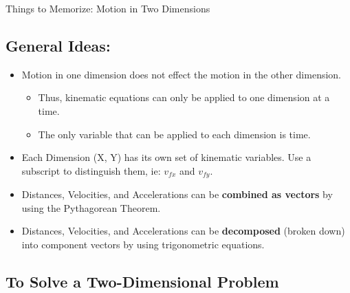 \documentclass[letterpaper, 12pt]{article}
\begin{document}
	


\begin{center}Things to Memorize: Motion in Two Dimensions
\end{center}

\subsection*{General Ideas:}
\begin{itemize}
	\item Motion in one dimension does not effect the motion in the other dimension.
	\begin{itemize}
		\item Thus, kinematic equations can only be applied to one dimension at a time. 
		\item The only variable that can be applied to each dimension is time.
		\end{itemize}
			
	\item Each Dimension (X, Y) has its own set of kinematic variables. Use a subscript to distinguish them, ie: $v_{fx}$ and $v_{fy}$.
	

	\item Distances, Velocities, and Accelerations can be \textbf{combined as vectors} by using the Pythagorean Theorem.
	\item Distances, Velocities, and Accelerations can be \textbf{decomposed} (broken down) into component vectors by using trigonometric equations. 
	
\end{itemize}

\subsection*{To Solve a Two-Dimensional Problem}
\end{document}
